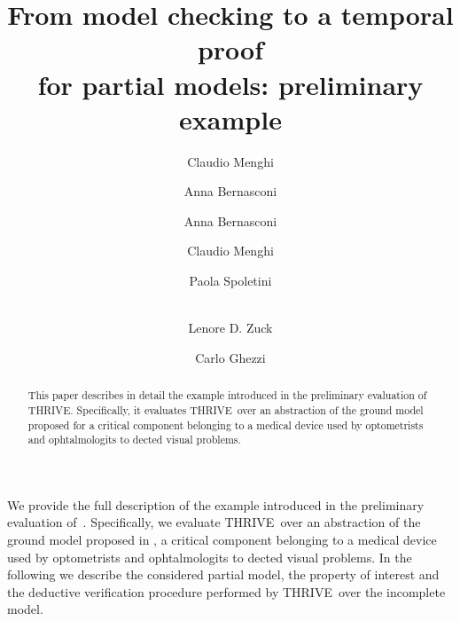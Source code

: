 \documentclass[runningheads,a4paper]{llncs}
\author{Claudio Menghi}
\author{Anna Bernasconi}
\newcommand{\NAME}{THRIVE}
\begin{document}
\captionsetup[longtable]{labelfont=bf}
\captionsetup[table]{labelfont=bf}
\captionsetup[figure]{labelfont=bf}



\title{From model checking to a temporal proof \\ for partial models: preliminary example}


%
%



\author{Anna Bernasconi
\and Claudio Menghi
\and Paola Spoletini
\and \\ Lenore D. Zuck
\and Carlo Ghezzi
}



\maketitle

%
\begin{abstract}
This paper describes in detail the example introduced in the preliminary evaluation of \NAME.
Specifically, it evaluates \NAME\ over an abstraction of the ground model proposed for a critical component belonging to a medical device used by optometrists and ophtalmologits to dected visual problems. 
\end{abstract}

We provide the full description of the example introduced in the preliminary evaluation of~\cite{Bernasconi}.
Specifically, we evaluate \NAME\ over an abstraction of the ground model proposed in \cite{arcaini2015formal}, a critical component belonging to a medical device used by optometrists and ophtalmologits to dected visual problems. 
In the following we describe the considered partial model, the property of interest and the deductive verification procedure performed by \NAME\ over the incomplete model.
\end{document}
